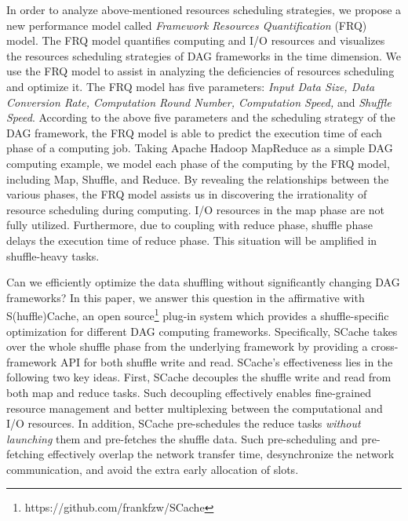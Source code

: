 {\color{black}
In order to analyze above-mentioned resources scheduling strategies, we propose a new performance model called \textit{Framework Resources Quantification} (FRQ) model. The FRQ model quantifies computing and I/O resources and visualizes the resources scheduling strategies of DAG frameworks in the time dimension. We use the FRQ model to assist in analyzing the deficiencies of resources scheduling and optimize it. 
The FRQ model has five parameters: \textit{Input Data Size, Data Conversion Rate, Computation Round Number, Computation Speed,} and \textit{Shuffle  Speed}.
According to the above five parameters and the scheduling strategy of the DAG framework, the FRQ model is able to predict the execution time of each phase of a computing job. 
Taking Apache Hadoop MapReduce as a simple DAG computing example, we model each phase of the computing by the FRQ model, including Map, Shuffle, and Reduce.
By revealing the relationships between the various phases, the FRQ model assists us in discovering the irrationality of resource scheduling during computing.
I/O resources in the map phase are not fully utilized. Furthermore, due to coupling with reduce phase, shuffle phase delays the execution time of reduce phase. 
This situation will be amplified in shuffle-heavy tasks.
}

Can we efficiently optimize the data shuffling without significantly changing DAG frameworks?
In this paper, we answer this question in the affirmative with S(huffle)Cache, an open source\footnote{https://github.com/frankfzw/SCache} plug-in system which provides a shuffle-specific optimization for different DAG computing frameworks.
Specifically, SCache takes over the whole shuffle phase from the underlying framework by providing a cross-framework API for both shuffle write and read.
SCache's effectiveness lies in the following two key ideas.
First, SCache decouples the shuffle write and read from both map and reduce tasks.
Such decoupling effectively enables fine-grained resource management and better multiplexing between the computational and I/O resources.
In addition, SCache pre-schedules the reduce tasks \emph{without launching} them and pre-fetches the shuffle data. 
Such pre-scheduling and pre-fetching effectively overlap the network transfer time, desynchronize the network communication, 
and avoid the extra early allocation of slots.

